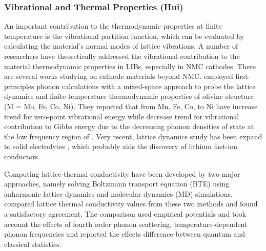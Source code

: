 \documentclass[../main.tex]{subfiles}
\begin{document}
\subsubsection{Vibrational and Thermal Properties (Hui)}
An important contribution to the thermodynamic properties at finite temperature is the vibrational partition function, which can be evaluated by calculating the material’s normal modes of lattice vibrations. A number of researchers have theoretically addressed the vibrational contribution to the material thermodynamic properties in LIBs, especially in NMC cathodes. \cite{du2016insight,yang2019highly,yang2020chemical} There are several works studying on cathode materials beyond NMC. \citeauthor{shang2012lattice} employed first-principles phonon calculations with a mixed-space approach to probe the lattice dynamics and finite-temperature thermodynamic properties of olivine structure  (M = Mo, Fe, Co, Ni).\cite{shang2012lattice} They reported that  from Mn, Fe, Co, to Ni have increase trend for zero-point vibrational energy while decrease trend for vibrational contribution to Gibbs energy due to the decreasing phonon densities of state at the low frequency region of .
Very recent, lattice dynamics study has been expand to solid electrolytes , which probably aids the discovery of lithium fast-ion conductors. \cite{sagotra2019influence} 

Computing lattice thermal conductivity have been developed by two major approaches, namely  solving Boltzmann transport equation (BTE) using anharmonic lattice dynamics and molecular dynamics (MD) simulations. \citeauthor{puligheddu2019computational} compared lattice thermal conductivity values from these two methods and found a satisfactory agreement.\cite{puligheddu2019computational} The comparison used empirical potentials and took account the effects of fourth order phonon scattering, temperature-dependent phonon frequencies and reported the effects difference between quantum and classical statistics.
\end{document}

